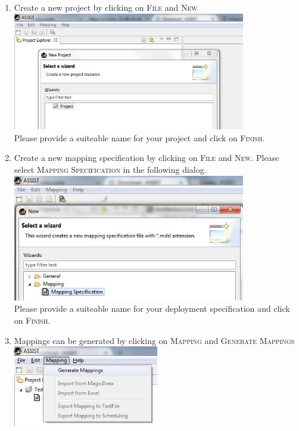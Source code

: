 \begin{enumerate}
\item Create a new project by clicking on \textsc{File} and \textsc{New}\\
\includegraphics[width=0.8\textwidth]{gfx/install-new-project.jpg}\\
Please provide a suiteable name for your project and click on \textsc{Finish}.

\item Create a new mapping specification by clicking on \textsc{File} and \textsc{New}. Please select \textsc{Mapping Specification} in the following dialog.\\
\includegraphics[width=0.8\textwidth]{gfx/install-new-mdsl-file.jpg}\\
Please provide a suiteable name for your deployment specification and click on \textsc{Finish}.

\item Mappings can be generated by clicking on \textsc{Mapping} and \textsc{Generate Mappings}\\
\includegraphics[width=0.5\textwidth]{gfx/install-generate-mappings.jpg}
\end{enumerate}


